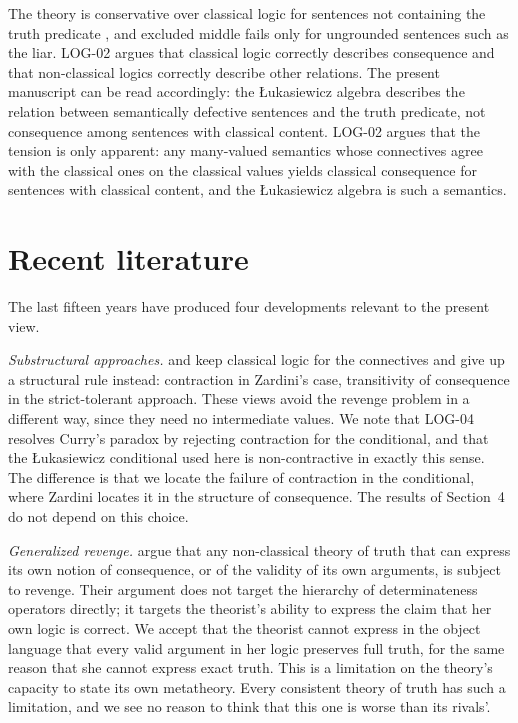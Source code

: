 \documentclass{situationist-preprint}
\begin{document}
\begin{reply}
The theory is conservative over classical logic for sentences not containing the truth predicate \citep{Field2008}, and excluded middle fails only for ungrounded sentences such as the liar. LOG-02 argues that classical logic correctly describes consequence and that non-classical logics correctly describe other relations. The present manuscript can be read accordingly: the Łukasiewicz algebra describes the relation between semantically defective sentences and the truth predicate, not consequence among sentences with classical content. LOG-02 argues that the tension is only apparent: any many-valued semantics whose connectives agree with the classical ones on the classical values yields classical consequence for sentences with classical content, and the Łukasiewicz algebra is such a semantics.
\end{reply}

\section{Recent literature}

The last fifteen years have produced four developments relevant to the present view.

\emph{Substructural approaches.} \citet{Zardini2011} and \citet{CobrerosEtAl2013} keep classical logic for the connectives and give up a structural rule instead: contraction in Zardini's case, transitivity of consequence in the strict-tolerant approach. These views avoid the revenge problem in a different way, since they need no intermediate values. We note that LOG-04 resolves Curry's paradox by rejecting contraction for the conditional, and that the Łukasiewicz conditional used here is non-contractive in exactly this sense. The difference is that we locate the failure of contraction in the conditional, where Zardini locates it in the structure of consequence. The results of Section~4 do not depend on this choice.

\emph{Generalized revenge.} \citet{MurziRossi2020} argue that any non-classical theory of truth that can express its own notion of consequence, or of the validity of its own arguments, is subject to revenge. Their argument does not target the hierarchy of determinateness operators directly; it targets the theorist's ability to express the claim that her own logic is correct. We accept that the theorist cannot express in the object language that every valid argument in her logic preserves full truth, for the same reason that she cannot express exact truth. This is a limitation on the theory's capacity to state its own metatheory. Every consistent theory of truth has such a limitation, and we see no reason to think that this one is worse than its rivals'.
\end{document}
